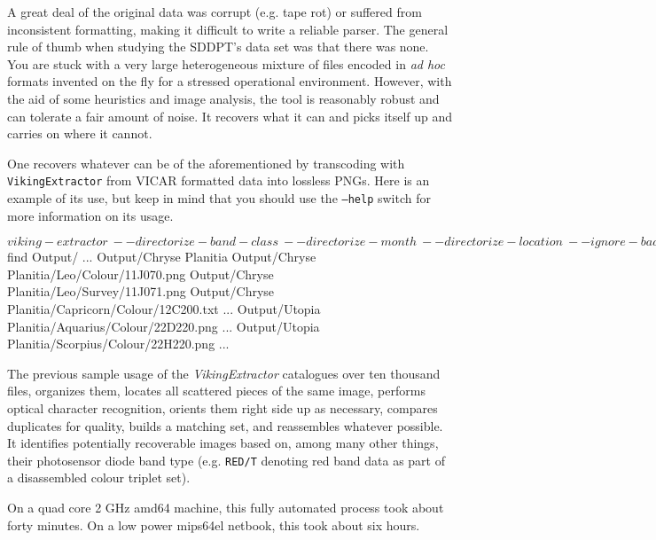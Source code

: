 A great deal of the original data was corrupt (e.g. tape rot) or suffered from inconsistent formatting, making it difficult to write a reliable parser. The general rule of thumb when studying the SDDPT's data set was that there was none. You are stuck with a very large heterogeneous mixture of files encoded in {\it ad hoc} formats invented on the fly for a stressed operational environment. However, with the aid of some heuristics and image analysis, the tool is reasonably robust and can tolerate a fair amount of noise. It recovers what it can and picks itself up and carries on where it cannot.

One recovers whatever can be of the aforementioned by transcoding with {\tt VikingExtractor} from VICAR formatted data into lossless PNGs. Here is an example of its use, but keep in mind that you should use the {\tt --help} switch for more information on its usage.

\startCodeExample
$ viking-extractor              \
    --directorize-band-class    \
    --directorize-month         \
    --directorize-location      \
    --ignore-bad-files          \
    --interlace                 \
    --recursive                 \
    --save-metadata             \
    --summarize-only            \
     Processed\ Images          \
     Output

$ find Output/
...
Output/Chryse Planitia
Output/Chryse Planitia/Leo/Colour/11J070.png
Output/Chryse Planitia/Leo/Survey/11J071.png
Output/Chryse Planitia/Capricorn/Colour/12C200.txt
...
Output/Utopia Planitia/Aquarius/Colour/22D220.png
...
Output/Utopia Planitia/Scorpius/Colour/22H220.png
...
\stopCodeExample

The previous sample usage of the {\it VikingExtractor} catalogues over ten thousand files, organizes them, locates all scattered pieces of the same image, performs optical character recognition, orients them right side up as necessary, compares duplicates for quality, builds a matching set, and reassembles whatever possible. It identifies potentially recoverable images based on, among many other things, their photosensor diode band type (e.g. {\tt RED/T} denoting red band data as part of a disassembled colour triplet set). 

On a quad core 2 GHz amd64 machine, this fully automated process took about forty minutes. On a low power mips64el netbook, this took about six hours.

